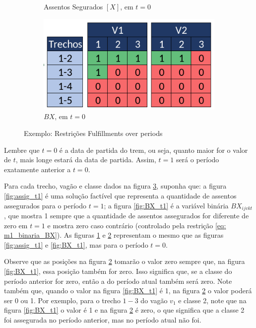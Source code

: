 \begin{figure}[h!]
\begin{subfigure}[b]{0.40\linewidth}
		\caption{Assentos Segurados $[X]$, em $t = 0$}
		\label{fig:assig_t0}
	\end{subfigure}\hspace{5mm}
	\begin{subfigure}[b]{0.40\linewidth}
		\includegraphics[width=\linewidth]{img/bx_to.png}
		\caption{$BX$, em $t = 0$}
		\label{fig:BX_t0}
	\end{subfigure}
	\caption{Exemplo: Restrições Fulfillments over periods}
	\label{fig: restricao_fulfillments}
\end{figure}

Lembre que $t=0$ é a data de partida do trem, ou seja, quanto maior for o valor de $t$, mais longe estará da data de partida. Assim, $t=1$ será o período exatamente anterior a $t=0$.

Para cada trecho, vagão e classe dados na figura \ref{fig: restricao_fulfillments}, suponha que: a figura \ref{fig:assig_t1} é uma solução factível que representa a quantidade de assentos assegurados para o período $t=1$; a figura \ref{fig:BX_t1}  é a variável binária $BX_{ijvkt}$, que mostra 1 sempre que a quantidade de assentos assegurados for diferente de zero em $t=1$ e mostra zero caso contrário (controlado pela restrição \ref{eq: m1_binaria_BX}). As figuras \ref{fig:assig_t0} e \ref{fig:BX_t0} representam o mesmo que as figuras \ref{fig:assig_t1} e \ref{fig:BX_t1}, mas para o período $t=0$.

Observe que as posições na figura \ref{fig:BX_t0} tomarão o valor zero sempre que, na figura \ref{fig:BX_t1}, essa posição também for zero. Isso significa que, se a classe do período anterior for zero, então a do período atual também será zero. Note também que, quando o valor na figura \ref{fig:BX_t1} é 1, na figura \ref{fig:BX_t0} o valor poderá ser 0 ou 1. Por exemplo, para o trecho $1-3$ do vagão $v_1$ e classe 2, note que na figura \ref{fig:BX_t1} o valor é 1 e na figura \ref{fig:BX_t0} é zero, o que significa que a classe 2 foi assegurada no período anterior, mas no período atual não foi.

